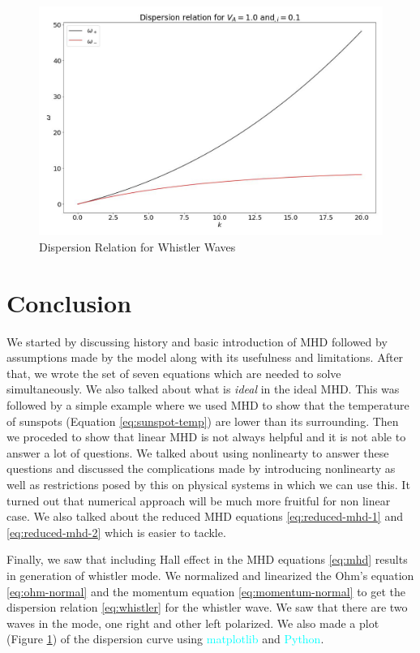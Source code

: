 \documentclass[12pt]{article}
\newenvironment{changemargin}[2]{%
\begin{list}{}{%
\setlength{\topsep}{0pt}%
\setlength{\leftmargin}{#1}%
\setlength{\rightmargin}{#2}%
\setlength{\listparindent}{\parindent}%
\setlength{\itemindent}{\parindent}%
\setlength{\parsep}{\parskip}%
}%
\item[]}{\end{list}}
\begin{document}
\begin{changemargin}{-2cm}{-2cm}
    \begin{figure}[h]
        \includegraphics[width=1.0\textwidth, height=0.78\textwidth]{dispersion.jpg}
        \caption{Dispersion Relation for Whistler Waves}
        \label{fig:whistler}
    \end{figure}
    \section{Conclusion}
    We started by discussing history and basic introduction of MHD followed by assumptions made by the model along with its usefulness and limitations. After that, we wrote the set of seven equations which are needed to solve simultaneously. We also talked about what is \textit{ideal} in the ideal MHD. This was followed by a simple example where we used MHD to show that the temperature of sunspots (Equation \ref{eq:sunspot-temp}) are lower than its surrounding. Then we proceded to show that linear MHD is not always helpful and it is not able to answer a lot of questions. We talked about using nonlinearty to answer these questions and discussed the complications made by introducing nonlinearty as well as restrictions posed by this on physical systems in which we can use this. It turned out that numerical approach will be much more fruitful for non linear case. We also talked about the reduced MHD equations \ref{eq:reduced-mhd-1} and \ref{eq:reduced-mhd-2} which is easier to tackle.

    Finally, we saw that including Hall effect in the MHD equations \ref{eq:mhd} results in generation of whistler mode. We normalized and linearized the Ohm's equation \ref{eq:ohm-normal} and the momentum equation \ref{eq:momentum-normal} to get the dispersion relation \ref{eq:whistler} for the whistler wave. We saw that there are two waves in the mode, one right and other left polarized. We also made a plot (Figure \ref{fig:whistler}) of the dispersion curve using \textcolor{cyan}{matplotlib} and \textcolor{cyan}{Python}.
    \printbibliography
\end{changemargin}
\end{document}
